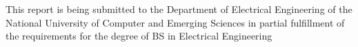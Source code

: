 \documentclass[11pt, a4paper, oneside]{Thesis} %
\begin{document}

\begin{center}


{\large This report is being submitted to the Department of Electrical Engineering of the National University of Computer and Emerging Sciences in partial fulfillment of the requirements for the degree of BS in Electrical Engineering}\\[0.5cm]
\end{center}


\end{document}
